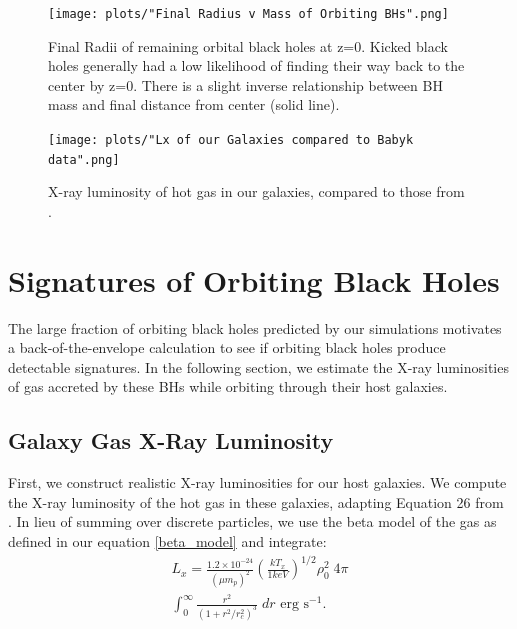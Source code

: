 \documentclass[fleqn,usenatbib,useAMS]{mnras}
\begin{document}
\begin{figure}
\begin{center}
\texttt{[image: plots/"Final Radius v Mass of Orbiting BHs".png]}
\caption{Final Radii of remaining orbital black holes at z=0.  Kicked black holes generally had a low likelihood of finding their way back to the center by z=0.  There is a slight inverse relationship between BH mass and final distance from center (solid line).}
\label{fig:mvr}
\end{center}
\end{figure}

\begin{figure}
\vspace{20pt}%
\begin{center}
\texttt{[image: plots/"Lx of our Galaxies compared to Babyk data".png]}
\caption{X-ray luminosity of hot gas in our galaxies, compared to those from \citet{2018ApJ...857...32B}.}
\label{fig:galgas1}
\end{center}
\end{figure}


\section{Signatures of Orbiting Black Holes}
The large fraction of orbiting black holes predicted by our simulations motivates a back-of-the-envelope calculation to see if orbiting black holes produce detectable signatures. In the following section, we estimate the X-ray luminosities of gas accreted by these BHs while orbiting through their host galaxies.

\subsection{Galaxy Gas X-Ray Luminosity}
First, we construct realistic X-ray luminosities for our host galaxies. We compute the X-ray luminosity of the hot gas in these galaxies, adapting Equation 26 from \citet{2012ApJ...754..125C}. In lieu of summing over discrete particles, we use the beta model of the gas as defined in our equation \ref{beta_model} and integrate:
\begin{equation}
\begin{aligned}
    L_x ={} \frac{1.2 \times 10^{-24}}{(\mu m_p)^2}\left(\frac{kT_x}{1keV}\right)^{1/2}\rho_0^{2}\;4{\pi} \\
    \int_{0}^{\infty}\frac{r^2}{(1+r^2/r_c^2)^{3}}\;dr\text{  erg s}^{-1}.
\end{aligned}
\end{equation}
\end{document}
